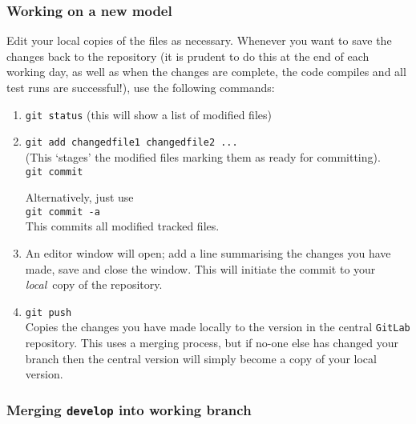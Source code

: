 \subsubsection{Working on a new model}

Edit your local copies of the files as necessary. Whenever you want to save
the changes back to the repository (it is prudent to do this at the end of
each working day, as well as when the changes are complete, the code compiles
and all test runs are successful!), use the following commands:
\begin{enumerate}

\item \texttt{git status}  (this will show a list of modified files)

\item \texttt{git add changedfile1 changedfile2 ...}  \\
  (This `stages' the modified files marking them as ready for committing).  \\
  \texttt{git commit}

  Alternatively, just use\\
  \texttt{git commit -a} \\
  This commits all modified tracked files.

\item An editor window will open; add a line summarising the changes you have made, save and close the window. This will initiate the commit to your \textit{local}\ copy of the repository.

\item \texttt{git push} \\
Copies the changes you have made locally to the version in the central \texttt{GitLab} repository.  This uses a merging process, but if no-one else has changed your branch then the central version will simply become a copy of your local version.

\end{enumerate}

\subsubsection{Merging \texttt{develop} into working branch}


